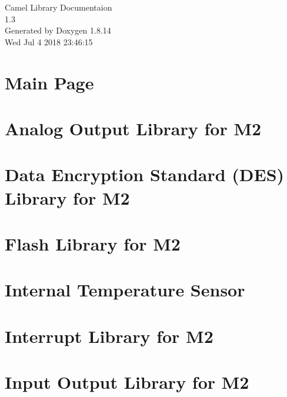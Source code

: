 \documentclass[twoside]{article}
\newcommand{\+}{\discretionary{\mbox{\scriptsize$\hookleftarrow$}}{}{}}
\begin{document}
\hypersetup{pageanchor=false,
             bookmarksnumbered=true,
             pdfencoding=unicode
            }
\begin{titlepage}
\vspace*{7cm}
\begin{center}%
{\Large Camel Library Documentaion \\[1ex]\large 1.\+3 }\\
\vspace*{1cm}
{\large Generated by Doxygen 1.8.14}\\
\vspace*{0.5cm}
{\small Wed Jul 4 2018 23:46:15}\\
\end{center}
\end{titlepage}
\tableofcontents
{}
\hypersetup{pageanchor=true}

\section{Main Page}
\label{index}\hypertarget{index}{}
\section{Analog Output Library for M2}
\label{a00139}

\section{Data Encryption Standard (D\+ES) Library for M2}
\label{a00140}

\section{Flash Library for M2}
\label{a00141}

\section{Internal Temperature Sensor}
\label{a00142}

\section{Interrupt Library for M2}
\label{a00143}

\section{Input Output Library for M2}
\label{a00144}

\end{document}
